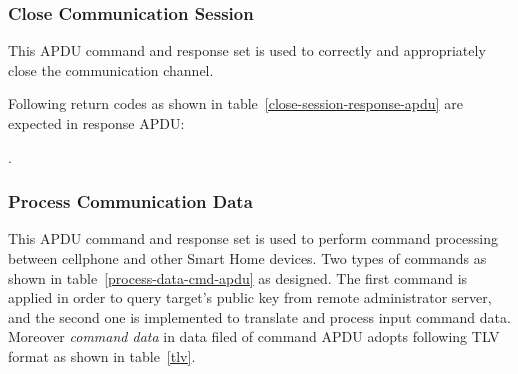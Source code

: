 \subsubsection{Close Communication Session}\label{secSessionClose}
This APDU command and response set is used to correctly and appropriately close the communication channel.


\begin{table}[!htb]
\caption{Close Session Command APDU}
\label{close-session-apdu}
\end{table}

Following return codes as shown in table~\ref{close-session-response-apdu} are expected in response APDU:

.\begin{table}[!htb]
\caption{Close Session Return Code}
\label{close-session-response-apdu}
\end{table}

\subsubsection{Process Communication Data }\sloppy
\begin{table}[!htb]
\caption{Process Data Command APDUs}
\label{process-data-cmd-apdu}
\end{table}
This APDU command and response set is used to perform command processing between cellphone and other Smart Home devices. Two types of commands as shown in table~\ref{process-data-cmd-apdu} as designed. The first command is applied in order to query target's public key from remote administrator server, and the second one is implemented to translate and process input command data.
Moreover \emph{command data} in data filed of command APDU adopts following TLV format as shown in table~\ref{tlv}. 

